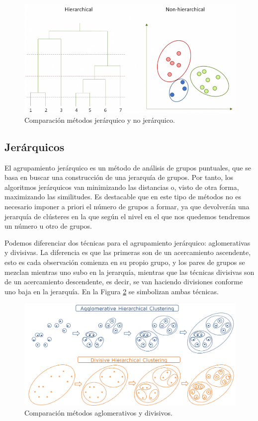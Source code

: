 \documentclass[a4paper, 20pt]{article}
\begin{document}
\begin{figure}[H]
	\centering
	\includegraphics[scale=0.55]{victoria/compJerarquicoNoJerarquico}
	\caption{Comparación métodos jerárquico y no jerárquico.}
	\label{fig:ejemplo_metodos}
\end{figure}


\subsection{Jerárquicos}
El agrupamiento jerárquico es un método de análisis de grupos puntuales, que se basa en buscar una construcción de una jerarquía de grupos. Por tanto, los algoritmos jerárquicos van minimizando las distancias  o, visto de otra forma, maximizando  las similitudes. Es destacable que en este tipo de métodos no es necesario imponer a priori el número de grupos a formar, ya que devolverán una jerarquía de clústeres en la que según el nivel en el que nos quedemos tendremos un número u otro de grupos.

Podemos diferenciar dos técnicas para el agrupamiento jerárquico: aglomerativas y divisivas. La diferencia es que las primeras son de un acercamiento ascendente, esto es cada observación comienza en su propio grupo, y los pares de grupos se mezclan mientras uno subo en la jerarquía, mientras que las técnicas divisivas son de un acercamiento descendente, es decir, se van haciendo divisiones conforme uno baja en la jerarquía. En la Figura \ref{fig:agl_div} se simbolizan ambas técnicas.


\vspace{5mm}

\begin{figure}[H]
	\centering
	\includegraphics[scale=0.25]{victoria/compAglomeDivisivo}
	\caption{Comparación métodos aglomerativos y divisivos.}
	\label{fig:agl_div}
\end{figure}
\end{document}
